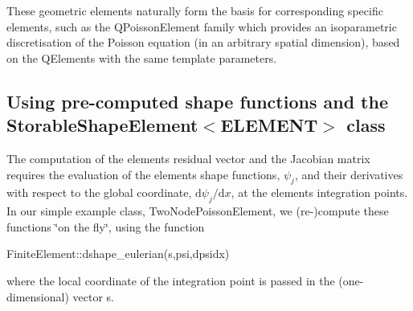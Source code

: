 These geometric elements naturally form the basis for corresponding specific elements, such as the {\ttfamily Q\+Poisson\+Element} family which provides an isoparametric discretisation of the Poisson equation (in an arbitrary spatial dimension), based on the {\ttfamily Q\+Elements} with the same template parameters.



\hypertarget{index_pre_compute_psi}{}\subsection{Using pre-\/computed shape functions and the Storable\+Shape\+Element$<$\+E\+L\+E\+M\+E\+N\+T$>$ class}\label{index_pre_compute_psi}
The computation of the element\textquotesingle{}s residual vector and the Jacobian matrix requires the evaluation of the element\textquotesingle{}s shape functions, $ \psi_j $, and their derivatives with respect to the global coordinate, $ \mbox{d}\psi_j/\mbox{d}x $, at the element\textquotesingle{}s integration points. In our simple example class, {\ttfamily Two\+Node\+Poisson\+Element}, we (re-\/)compute these functions \char`\"{}on the fly\char`\"{}, using the function 
\begin{DoxyCode}
FiniteElement::dshape\_eulerian(s,psi,dpsidx)
\end{DoxyCode}
 where the local coordinate of the integration point is passed in the (one-\/dimensional) vector {\ttfamily s}.

